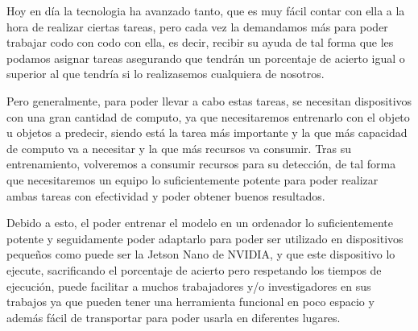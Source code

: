 
Hoy en día la tecnologia ha avanzado tanto, que es muy fácil contar con ella a la hora de realizar ciertas tareas, pero cada vez la demandamos 
más para poder trabajar codo con codo con ella, es decir, recibir su ayuda de tal forma que les podamos asignar tareas asegurando que tendrán un
porcentaje de acierto igual o superior al que tendría si lo realizasemos cualquiera de nosotros.

Pero generalmente, para poder llevar a cabo estas tareas, se necesitan dispositivos con una gran cantidad de computo, ya que necesitaremos entrenarlo 
con el objeto u objetos a predecir, siendo está la tarea más importante y la que más capacidad de computo va a necesitar y la que más recursos va consumir.
Tras su entrenamiento, volveremos a consumir recursos para su detección, de tal forma que necesitaremos un equipo lo suficientemente potente para poder realizar
ambas tareas con efectividad y poder obtener buenos resultados.

Debido a esto, el poder entrenar el modelo en un ordenador lo suficientemente potente y seguidamente poder adaptarlo para poder ser utilizado en dispositivos pequeños
como puede ser la Jetson Nano de NVIDIA, y que este dispositivo lo ejecute, sacrificando el porcentaje de acierto pero respetando los tiempos de ejecución, puede facilitar a
muchos trabajadores y/o investigadores en sus trabajos ya que pueden tener una herramienta funcional en poco espacio y además fácil de transportar para poder usarla en diferentes
lugares.

\clearpage

